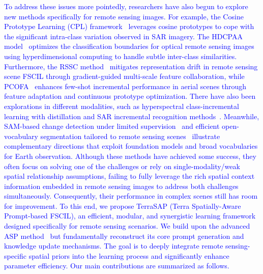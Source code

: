 ﻿\documentclass[letterpaper,journal]{IEEEtran}
\begin{document}
\textcolor{blue}{To address these issues more pointedly, researchers have also begun to explore new methods specifically for remote sensing images. For example, the Cosine Prototype Learning (CPL) framework~\cite{zhao2023} leverages cosine prototypes to cope with the significant intra-class variation observed in SAR imagery. The HDCPAA model~\cite{li2025} optimizes the classification boundaries for optical remote sensing images using hyperdimensional computing to handle subtle inter-class similarities. Furthermore, the RSSC method~\cite{nwpu_cankao} mitigates representation drift in remote sensing scene FSCIL through gradient-guided multi-scale feature collaboration, while PCOFA~\cite{zeng2022pcofa} enhances few-shot incremental performance in aerial scenes through feature adaptation and continuous prototype optimization. There have also been explorations in different modalities, such as hyperspectral class-incremental learning with distillation and SAR incremental recognition methods~\cite{xu2022rs,chen2019,zhang2025pfs3f,liang2025dbmlla,zhang2025msgfus}. Meanwhile, SAM-based change detection under limited supervision~\cite{gao2025samchange} and efficient open-vocabulary segmentation tailored to remote sensing scenes~\cite{cao2025openvocab} illustrate complementary directions that exploit foundation models and broad vocabularies for Earth observation. Although these methods have achieved some success, they often focus on solving one of the challenges or rely on single-modality/weak spatial relationship assumptions, failing to fully leverage the rich spatial context information embedded in remote sensing images to address both challenges simultaneously. Consequently, their performance in complex scenes still has room for improvement. To this end, we propose TerraSAP (Terra Spatially-Aware Prompt-based FSCIL), an efficient, modular, and synergistic learning framework designed specifically for remote sensing scenarios. We build upon the advanced ASP method~\cite{liu2024} but fundamentally reconstruct its core prompt generation and knowledge update mechanisms. The goal is to deeply integrate remote sensing-specific spatial priors into the learning process and significantly enhance parameter efficiency. Our main contributions are summarized as follows.}
\end{document}
